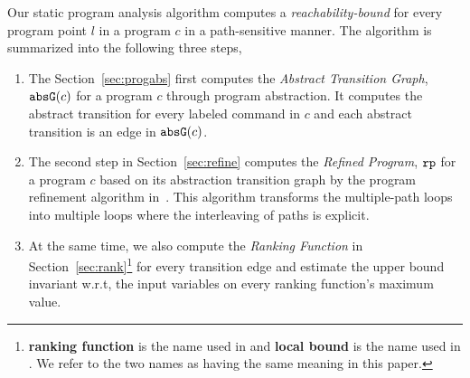 Our static program analysis algorithm computes 
a \emph{reachability-bound} for every program point $l$ in a program $c$ in a path-sensitive manner.
The algorithm is summarized into the following three steps,
\begin{enumerate}
\item The Section~\ref{sec:progabs} first 
computes the \emph{Abstract Transition Graph}, $\mathtt{abs}{\mathtt{G}}(c)$ for a program $c$ through program abstraction.
It computes the abstract transition 
for every labeled command in $c$ and each abstract transition is an edge in $\mathtt{abs}{\mathtt{G}}(c)$.
\item The second step in Section~\ref{sec:refine}
computes the \emph{Refined Program}, $\mathtt{rp}$ for a program $c$ based on 
its abstraction transition graph by the program refinement algorithm in~\cite{GulwaniJK09}.
This algorithm transforms the multiple-path loops
into multiple loops where
the interleaving of paths is explicit.
\item At the same time, we also compute the \emph{Ranking Function} in Section~\ref{sec:rank}\footnote{\textbf{ranking function} is the name used in \cite{SinnZV14}
and \textbf{local bound} is the name used in \cite{ZulegerGSV11, SinnZV17}.
We refer to the two names as having the same meaning in this paper.} for every transition edge 
and estimate the upper bound invariant w.r.t, the input variables on every ranking function's maximum value.


\end{enumerate}
